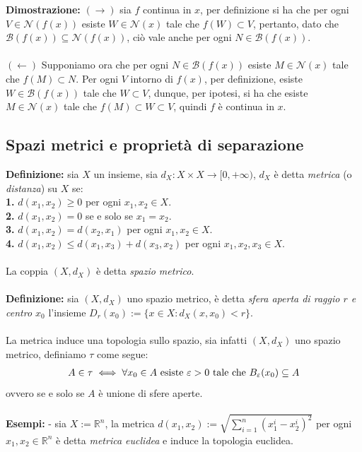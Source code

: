 \documentclass{article}
\begin{document}
\textbf{Dimostrazione:} $(\rightarrow)$ sia $f$ continua in $x$, per definizione si ha che per ogni $V \in \mathcal{N}(f(x))$ esiste $W \in \mathcal{N}(x)$ tale che $f(W) \subset V$, pertanto, dato che $\mathcal{B}(f(x)) \subseteq \mathcal{N}(f(x))$, ciò vale anche per ogni $N \in \mathcal{B}(f(x))$. \\ \\
$(\leftarrow)$ Supponiamo ora che per ogni $N \in \mathcal{B}(f(x))$ esiste $M \in \mathcal{N}(x)$ tale che $f(M) \subset N$. Per ogni $V$ intorno di $f(x)$, per definizione, esiste $W \in \mathcal{B}(f(x))$ tale che $W \subset V$, dunque, per ipotesi, si ha che esiste $M \in \mathcal{N}(x)$ tale che $f(M) \subset W \subset V$, quindi $f$ è continua in $x$.

\newpage
\subsection{Spazi metrici e proprietà di separazione}
\textbf{Definizione:} sia $X$ un insieme, sia $d_X : X \times X \longrightarrow [0, + \infty)$, $d_X$ è detta \textit{metrica} (o \textit{distanza}) su $X$ se: \\
\textbf{1.} $d(x_1, x_2) \geq 0$ per ogni $x_1, x_2 \in X$. \\
\textbf{2.} $d(x_1, x_2) = 0$ se e solo se $x_1 = x_2$. \\
\textbf{3.} $d(x_1, x_2) = d(x_2, x_1)$ per ogni $x_1, x_2 \in X$. \\
\textbf{4.} $d(x_1, x_2) \leq d(x_1, x_3) + d(x_3, x_2)$ per ogni $x_1, x_2, x_3 \in X$. \\ \\
La coppia $(X, d_X)$ è detta \textit{spazio metrico}. \\ \\
\textbf{Definizione:} sia $(X, d_X)$ uno spazio metrico, è detta \textit{sfera aperta di raggio $r$ e centro $x_0$} l'insieme $D_r(x_0) := \{ x \in X : d_X(x, x_0) < r \}$. \\ \\
La metrica induce una topologia sullo spazio, sia infatti $(X, d_X)$ uno spazio metrico, definiamo $\tau$ come segue:
\begin{gather}
    A \in \tau \iff \forall x_0 \in A \text{ esiste } \varepsilon > 0 \text{ tale che } B_\varepsilon(x_0) \subseteq A \notag
\end{gather}
ovvero se e solo se $A$ è unione di sfere aperte. \\ \\
\textbf{Esempi:} - sia $X := \mathbb{R}^n$, la metrica $d(x_1, x_2) := \sqrt{\sum_{i = 1}^n (x_1^i - x_2^i)^2}$ per ogni $x_1, x_2 \in \mathbb{R}^n$ è detta \textit{metrica euclidea} e induce la topologia euclidea. \\
\end{document}
